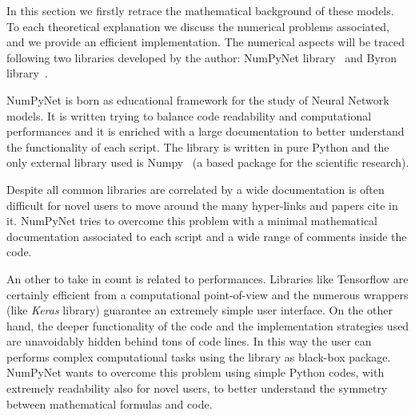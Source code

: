 \documentclass{standalone}
\begin{document}
In this section we firstly retrace the mathematical background of these models.
To each theoretical explanation we discuss the numerical problems associated, and we provide an efficient implementation.
The numerical aspects will be traced following two libraries developed by the author: \textsf{NumPyNet} library~\cite{NumPyNet} and \textsf{Byron} library~\cite{Byron}.

\textsf{NumPyNet} is born as educational framework for the study of Neural Network models.
It is written trying to balance code readability and computational performances and it is enriched with a large documentation to better understand the functionality of each script.
The library is written in pure \textsf{Python} and the only external library used is \textsf{Numpy}~\cite{Numpy} (a based package for the scientific research).

Despite all common libraries are correlated by a wide documentation is often difficult for novel users to move around the many hyper-links and papers cite in it.
\textsf{NumPyNet} tries to overcome this problem with a minimal mathematical documentation associated to each script and a wide range of comments inside the code.

An other  to take in count is related to performances.
Libraries like \textsf{Tensorflow} are certainly efficient from a computational point-of-view and the numerous wrappers (like \emph{Keras} library) guarantee an extremely simple user interface.
On the other hand, the deeper functionality of the code and the implementation strategies used are unavoidably hidden behind tons of code lines.
In this way the user can performs complex computational tasks using the library as black-box package.
\textsf{NumPyNet} wants to overcome this problem using simple \textsf{Python} codes, with extremely readability also for novel users, to better understand the symmetry between mathematical formulas and code.
\end{document}
